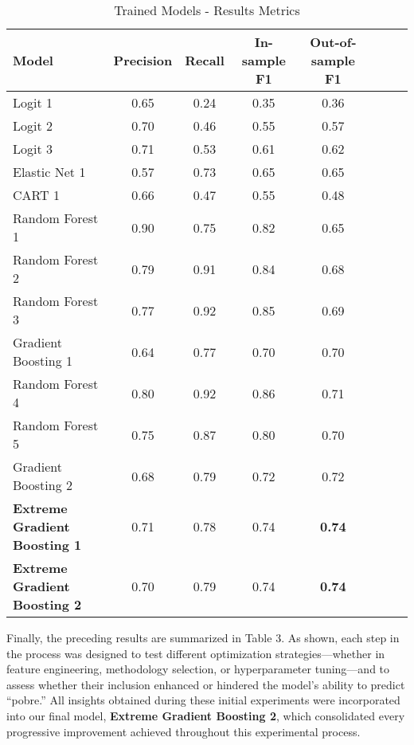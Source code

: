 \documentclass[12pt,a4paper,onecolumn]{article}
\begin{document}
 \begin{table}[h!]
 \footnotesize
\caption{Trained Models - Results Metrics} 
\centering
\begin{tabular}{l c c c c c c c}
\hline
\textbf{Model} & \textbf{Precision} & \textbf{Recall} & \textbf{In-sample F1} & \textbf{Out-of-sample F1}  \\
\hline
Logit 1 & 0.65 & 0.24 & 0.35  &    0.36   \\
Logit 2 & 0.70 &  0.46 & 0.55 &    0.57   \\
Logit 3 & 0.71 & 0.53  &  0.61 & 0.62   \\
Elastic Net  1    & 0.57 & 0.73  & 0.65  & 0.65\\
CART 1   & 0.66 & 0.47  & 0.55 & 0.48      \\
Random Forest 1    & 0.90 & 0.75  & 0.82 &  0.65      \\
Random Forest 2 & 0.79 & 0.91  & 0.84  & 0.68    \\
Random Forest 3  & 0.77 & 0.92  & 0.85  & 0.69   \\
Gradient Boosting 1    & 0.64 & 0.77  &  0.70 &  0.70   \\
Random Forest 4  & 0.80 & 0.92  & 0.86  &  0.71    \\
Random Forest 5 & 0.75 &  0.87 & 0.80  &  0.70     \\
Gradient Boosting 2    &0.68 & 0.79  & 0.72  &   0.72  \\
\textbf{Extreme Gradient Boosting 1} & 0.71 & 0.78  & 0.74  &  \textbf{0.74}    \\
\textbf{Extreme Gradient Boosting 2}    &0.70 & 0.79  & 0.74  &   \textbf{0.74}  \\

\hline
\end{tabular}
\vspace{0.5em}
\small{\parbox{\linewidth}{%

}}
\end{table}


Finally, the preceding results are summarized in Table 3. As shown, each step in the process was designed to test different optimization strategies—whether in feature engineering, methodology selection, or hyperparameter tuning—and to assess whether their inclusion enhanced or hindered the model’s ability to predict “pobre.” All insights obtained during these initial experiments were incorporated into our final model, \textbf{Extreme Gradient Boosting 2}, which consolidated every progressive improvement achieved throughout this experimental process.
\end{document}
